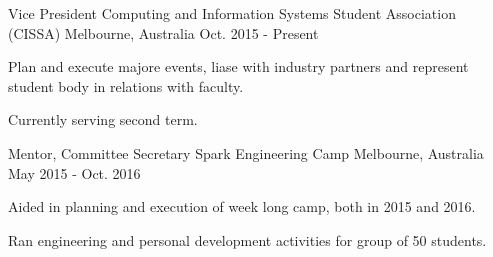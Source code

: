 \begin{cventries}
  \cventry
    {Vice President}
    {Computing and Information Systems Student Association (CISSA)}
    {Melbourne, Australia}
    {Oct. 2015 - Present}
    {
      \begin{cvitems}
        \item {Plan and execute majore events, liase with industry partners and represent student body in relations with faculty.}
        \item {Currently serving second term.}
      \end{cvitems}
    }
    \cventry
    {Mentor, Committee Secretary}
    {Spark Engineering Camp}
    {Melbourne, Australia}
    {May 2015 - Oct. 2016}
    {
      \begin{cvitems}
        \item {Aided in planning and execution of week long camp, both in 2015 and 2016.}
        \item {Ran engineering and personal development activities for group of 50 students. }
      \end{cvitems}
    }
\end{cventries}
\vspace{-5mm}
